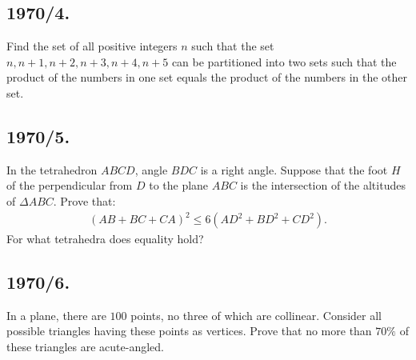 \documentclass{article}
\begin{document}
\subsection*{1970/4.}
Find the set of all positive integers $n$ such that the set ${n, n+1, n+2, n+3, n+4, n+5}$ can be partitioned into two sets such that the product of the numbers in one set equals the product of the numbers in the other set.

\subsection*{1970/5.}
In the tetrahedron $ABCD$, angle $BDC$ is a right angle. Suppose that the foot $H$ of the perpendicular from $D$ to the plane $ABC$ is the intersection of the altitudes of $\Delta ABC$. Prove that:
\begin{align}
	(AB + BC + CA)^2 \leq 6(AD^2 + BD^2 + CD^2).
\end{align}
For what tetrahedra does equality hold?

\subsection*{1970/6.}
In a plane, there are $100$ points, no three of which are collinear. Consider all possible triangles having these points as vertices. Prove that no more than $70\%$ of these triangles are acute-angled.
\end{document}

